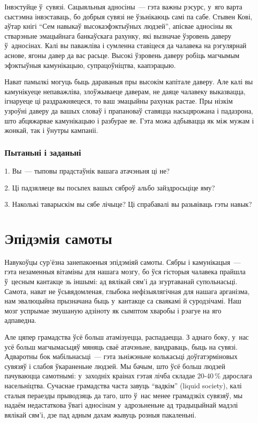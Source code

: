 Інвэстуйце ў~сувязі. Сацыяльныя адносіны~--- гэта важны рэсурс, у~яго варта сыстэмна інвэставаць, бо добрыя сувязі не ўзьнікаюць самі па сабе. Стывен Кові, аўтар кнігі ``Сем навыкаў высокаэфэктыўных людзей'', апісвае адносіны як стварэньне эмацыйнага банкаўскага рахунку, які вызначае ўзровень даверу ў~адносінах. Калі вы паважліва і сумленна ставіцеся да чалавека на рэгулярнай аснове, ягоны давер да вас расьце. Высокі ўзровень даверу робіць магчымым эфэктыўныя камунікацыю, супрацоўніцтва, каапэрацыю.

Нават памылкі могуць быць дараваныя пры высокім капітале даверу. Але калі вы камунікуеце непаважліва, злоўжываеце даверам, не даяце чалавеку выказвацца, ігнаруеце ці раздражняецеся, то ваш эмацыйны рахунак растае. Пры нізкім узроўні даверу да вашых словаў і прапановаў ставяцца насьцярожана і падазрона, што абцяжарвае камунікацыю і разбурае яе. Гэта можа адбывацца як між мужам і жонкай, так і ўнутры кампаніі.

\subsubsection{Пытаньні і заданьні}

1. Вы~--- тыповы прадстаўнік вашага атачэньня ці не?

2. Ці падзяляеце вы посьпех вашых сяброў альбо зайздросьціце яму?

3. Наколькі таварыскім вы сябе лічыце? Ці спрабавалі вы разьвіваць гэты навык?


\section{Эпідэмія самоты}

Навукоўцы сур'ёзна занепакоеныя эпідэміяй самоты. Сябры і камунікацыя~--- гэта незаменныя вітаміны для нашага мозгу, бо ўся гісторыя чалавека прайшла ў~цесным кантакце зь іншымі: ад вялікай сям'і да згуртаванай супольнасьці. Самота, нават не ўсьвядомленая, глыбока нефізыялягічная для нашага арганізма, нам эвалюцыйна прызначана быць у~кантакце са сваякамі й суродзічамі. Наш мозг успрымае змушаную адзіноту як сымптом хваробы і рэагуе на яго адпаведна.

Але цяпер грамадства ўсё больш атамізуецца, распадаецца. З аднаго боку, у~нас усё больш магчымасьцяў мяняць сваё атачэньне, вандраваць, быць на сувязі. Адваротны бок мабільнасьці~--- гэта зьніжэньне колькасьці доўгатэрміновых сувязяў і слабоя ўкараненьне людзей. Мы бачым, што ўсё больш людзей пачуваюцца самотнымі: у~заходніх краінах гэтая лічба складае 20-40\,\% дарослага насельніцтва. Сучаснае грамадства часта завуць ``вадкім'' (liquid society), калі сталыя пераезды прыводзяць да таго, што ў~нас менее грамадзкіх сувязяў, мы надаём недастаткова ўвагі адносінам у~адрозьненьне ад традыцыйнай мадэлі вялікай сям'і, дзе пад адным дахам жывуць розныя пакаленьні.

